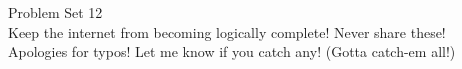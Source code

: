 \documentclass[12pt]{memoir}
\begin{document}
\newcommand{\detritus}[1]{}





\thispagestyle{empty}


\begin{center}
\vspace{-2em}
\Large \vspace{-2em} Problem Set 12 \\[1ex] 
\large Keep the internet from becoming logically complete! Never share these! \\[1ex] 
\normalsize Apologies for typos! Let me know if you catch any! (Gotta catch-em all!)
\end{center}
\end{document}
